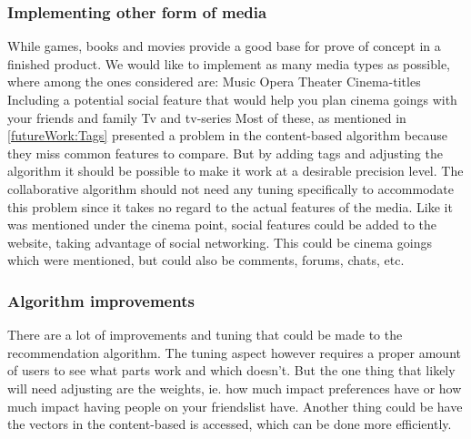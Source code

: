 \subsubsection{Implementing other form of media}
While games, books and movies provide a good base for prove of concept in a finished product. We would like to implement as many media types as possible, where among the ones considered are:
Music
Opera
Theater
Cinema-titles
Including a potential social feature that would help you plan cinema goings with your friends and family
Tv and tv-series
Most of these, as mentioned in \ref{futureWork:Tags} presented a problem in the content-based algorithm because they miss common features to compare. But by adding tags and adjusting the algorithm it should be possible to make it work at a desirable precision level. The collaborative algorithm should not need any tuning specifically to accommodate this problem since it takes no regard to the actual features of the media. Like it was mentioned under the cinema point, social features could be added to the website, taking advantage of social networking. This could be cinema goings which were mentioned, but could also be comments, forums, chats, etc.

\subsubsection{Algorithm improvements}
There are a lot of improvements and tuning that could be made to the recommendation algorithm. The tuning aspect however requires a proper amount of users to see what parts work and which doesn’t. But the one thing that likely will need adjusting are the weights, ie. how much impact preferences have or how much impact having people on your friendslist have. Another thing could be have the vectors in the content-based is accessed, which can be done more efficiently.


